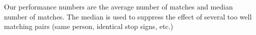 \documentclass[journal]{IEEEtran}
\begin{document}

Our performance numbers are the average number of matches and median
number of matches. The median is used to suppress the effect of
several too well matching pairs (same person, identical
stop signs, etc.)

%
\end{document}
